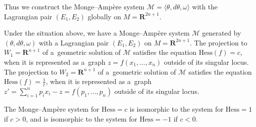 Thus we construct
the Monge--Amp{\`e}re system $\mathcal{M}=\langle \theta, d\theta,
\omega \rangle $
with the Lagrangian pair $(E_1,E_2)$ globally on $M={\mathbf{R}}^{2n+1}$.


\begin{Prop}
Under the situation above,
we have a Monge--Amp{\`e}re system
$\mathcal{M}$ generated by $(\theta, d\theta, \omega)$
with a Lagrangian pair $(E_1,E_2)$ on $M={\mathbf R}^{2n+1}$.
The projection to $W_1 = {\mathbf{R}}^{n+1}$
of a~geometric solution of $\mathcal{M}$ satisfies the equation
$\textrm{Hess}(f)=c$, when it is represented as a~graph
$z = f(x_1,\dots,x_n)$
outside of its singular locus.
The projection to $W_2 = {\mathbf{R}}^{n+1}$
of a~geometric solution of $\mathcal{M}$ satisfies the equation
$\textrm{Hess}(f)=\frac{1}{c}$, when it is represented as a~graph
$z'=\sum\limits_{i=1}^np_ix_i-z = f(p_1,\dots,p_n)$
outside of its singular locus.
\end{Prop}

\begin{Rem}
The Monge--Amp{\`e}re system for ${\mathrm{Hess}} = c$
is isomorphic to the system for ${\mathrm{Hess}} = 1$ if $c > 0$, and
is isomorphic to the system for ${\mathrm{Hess}} = -1$ if $c < 0$.
\end{Rem}

